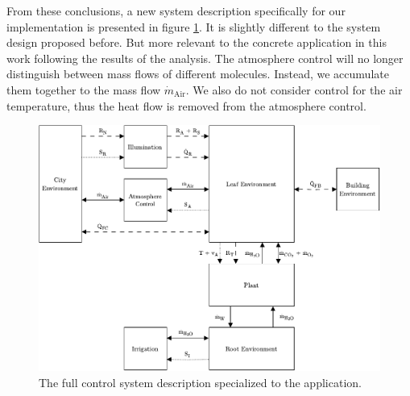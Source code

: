 From these conclusions, a new system description specifically for our implementation is presented in figure \ref{fig:system-definition}.
It is slightly different to the system design proposed before.
But more relevant to the concrete application in this work following the results of the analysis. %
The atmosphere control will no longer distinguish between mass flows of different molecules.
Instead, we accumulate them together to the mass flow $\dot{m}_{\text{Air}}$.
We also do not consider control for the air temperature, thus the heat flow is removed from the atmosphere control.



\begin{figure}[htbp]
  \centering
  \includegraphics[width=\textwidth]{img/system_analysis/system-definition.pdf}
  \caption{The full control system description specialized to the application.}
  \label{fig:system-definition}
\end{figure}


